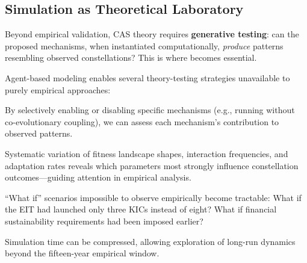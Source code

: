 \documentclass[../main.tex]{subfiles}
\begin{document}
\subsection{Simulation as Theoretical Laboratory}

Beyond empirical validation, CAS theory requires \textbf{generative testing}: can the proposed mechanisms, when instantiated computationally, \emph{produce} patterns resembling observed constellations? This is where \RoleSim becomes essential.

Agent-based modeling enables several theory-testing strategies unavailable to purely empirical approaches:

\begin{description}[leftmargin=0.5cm, itemsep=0.3em]
\item[Mechanism isolation] By selectively enabling or disabling specific mechanisms (e.g., running \RoleSim without co-evolutionary coupling), we can assess each mechanism's contribution to observed patterns.

\item[Parameter sensitivity] Systematic variation of fitness landscape shapes, interaction frequencies, and adaptation rates reveals which parameters most strongly influence constellation outcomes---guiding attention in empirical analysis.

\item[Counterfactual exploration] ``What if'' scenarios impossible to observe empirically become tractable: What if the EIT had launched only three KICs instead of eight? What if financial sustainability requirements had been imposed earlier?

\item[Temporal acceleration] Simulation time can be compressed, allowing exploration of long-run dynamics beyond the fifteen-year empirical window.
\end{description}
\end{document}
